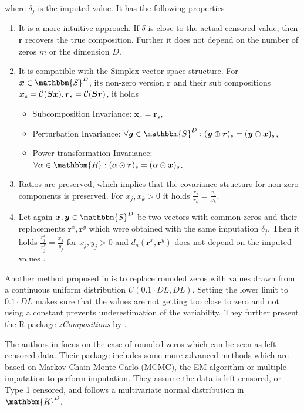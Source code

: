 where $\delta_j$ is the imputed value. It has the following properties

\begin{enumerate}
	\item It is a more intuitive approach. If $\delta$ is close to the actual censored value, then $\bm{r}$ recovers the true composition. Further it does not depend on the number of zeros $m$ or the dimension $D$. 
	\item It is compatible with the Simplex vector space structure. For $\bm{x} \in \mathbbm{S}^D$, its non-zero version $\bm{r}$ and their sub compositions $\bm{x}_s = \mathcal{C}(\bm{Sx}),\bm{r}_s = \mathcal{C}(\bm{Sr})$, it holds 
	\begin{itemize}
		\item Subcomposition Invariance: $\bm{x}_s = \bm{r}_s$,
		\item Perturbation Invariance: $\forall \bm{y} \in \mathbbm{S}^D: (\bm{y} \oplus \bm{r})_s = (\bm{y} \oplus \bm{x})_s$,
		\item Power transformation Invariance: $\forall \alpha \in \mathbbm{R}: (\alpha \odot \bm{r})_s = (\alpha \odot \bm{x})_s$. 
	\end{itemize}
	\item Ratios are preserved, which implies that the covariance structure for non-zero components is preserved. For  $x_j,x_k >0$ it holds $\frac{r_j}{r_k} = \frac{x_j}{x_k}$. 
	\item Let again $\bm{x},\bm{y} \in \mathbbm{S}^D$ be two vectors with common zeros and their replacements $\bm{r}^x,\bm{r}^y$ which were obtained with the same imputation $\delta_j$. Then it holds $\frac{r^x_j}{r^y_j}=\frac{x_j}{y_j}$ for $x_j,y_j>0$ and $d_a(\bm{r}^x,\bm{r}^y)$ does not depend on the imputed values \cite{Josep:2003}. 
\end{enumerate}

Another method proposed in \cite{Lubbe:2021} is to replace rounded zeros with values drawn from a continuous uniform distribution $U(0.1\cdot DL,DL)$. Setting the lower limit to $0.1\cdot DL$ makes sure that the values are not getting too close to zero and not using a constant prevents underestimation of the variability. They further present the R-package \textit{zCompositions} by \cite{Palarea-Albaladejo:2015}. 

The authors in \cite{Palarea-Albaladejo:2015} focus on the case of rounded zeros which can be seen as left censored data. Their package includes some more advanced methods which are based on Markov Chain Monte Carlo (MCMC), the EM algorithm or multiple imputation to perform imputation. They assume the data is left-censored, or Type 1 censored, and follows a multivariate normal distribution in $\mathbbm{R}^D$. 

